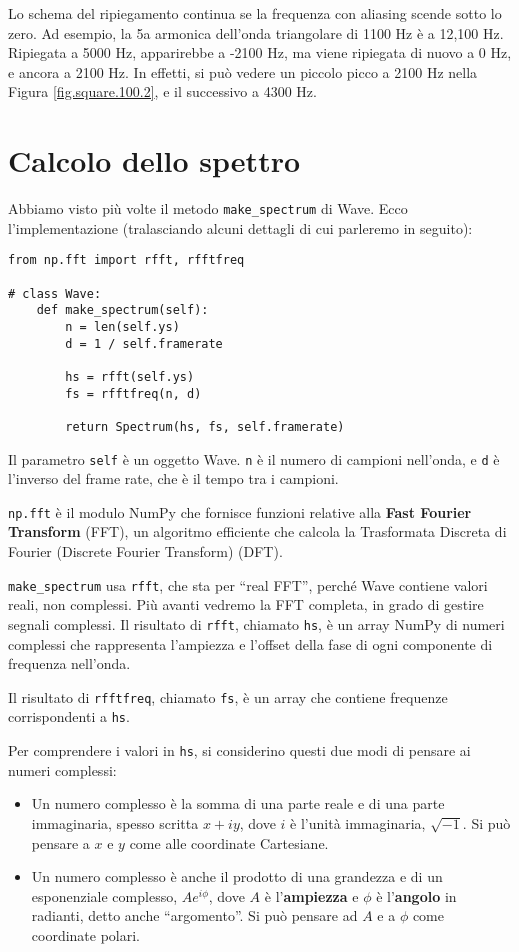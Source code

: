 \documentclass[12pt]{book} \usepackage[width=5.5in,height=8.5in, hmarginratio=3:2,vmarginratio=1:1]{geometry}
\begin{document}
Lo schema del ripiegamento continua se la frequenza con aliasing scende sotto lo zero. Ad esempio, la 5a armonica dell'onda triangolare di 1100 Hz è a 12,100 Hz. Ripiegata a 5000 Hz, apparirebbe a -2100 Hz, ma viene ripiegata di nuovo a 0 Hz, e ancora a 2100 Hz. In effetti, si può vedere un piccolo picco a 2100 Hz nella Figura \ref{fig.square.100.2}, e il successivo a 4300 Hz.

\section{Calcolo dello spettro} 

Abbiamo visto più volte il metodo \verb"make_spectrum" di Wave. Ecco l'implementazione (tralasciando alcuni dettagli di cui parleremo in seguito):

\begin{verbatim} 
from np.fft import rfft, rfftfreq

# class Wave:
    def make_spectrum(self):
        n = len(self.ys)
        d = 1 / self.framerate

        hs = rfft(self.ys)
        fs = rfftfreq(n, d)

        return Spectrum(hs, fs, self.framerate)
 \end{verbatim} 

Il parametro {\tt self} è un oggetto Wave. {\tt n} è il numero di campioni nell'onda, e {\tt d} è l'inverso del frame rate, che è il tempo tra i campioni.

{\tt np.fft} è il modulo NumPy che fornisce funzioni relative alla {\bf Fast Fourier Transform} (FFT), un algoritmo efficiente che calcola la Trasformata Discreta di Fourier (Discrete Fourier Transform) (DFT).

\verb"make_spectrum" usa {\tt rfft}, che sta per ``real FFT'', perché Wave contiene valori reali, non complessi. Più avanti vedremo la FFT completa, in grado di gestire segnali complessi. Il risultato di {\tt rfft}, chiamato {\tt hs}, è un array NumPy di numeri complessi che rappresenta l'ampiezza e l'offset della fase di ogni componente di frequenza nell'onda.

Il risultato di {\tt rfftfreq}, chiamato {\tt fs}, è un array che contiene frequenze corrispondenti a {\tt hs}.

Per comprendere i valori in {\tt hs}, si considerino questi due modi di pensare ai numeri complessi:

\begin{itemize} 

\item Un numero complesso è la somma di una parte reale e di una parte immaginaria, spesso scritta $x + iy$, dove $i$ è l'unità immaginaria, $\sqrt{-1}$. Si può pensare a $x$ e $y$ come alle coordinate Cartesiane.

\item Un numero complesso è anche il prodotto di una grandezza e di un esponenziale complesso, $A e^{i \phi}$, dove $A$ è l'{\bf ampiezza} e $\phi$ è l'{\bf angolo} in radianti, detto anche ``argomento''. Si può pensare ad $A$ e a $\phi$ come coordinate polari.

\end{itemize} 
\end{document}
